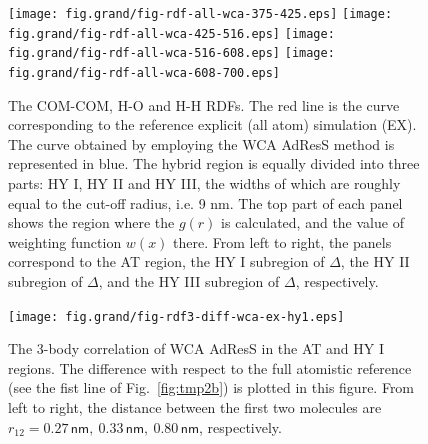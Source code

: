 \documentclass[aip,jcp,a4paper,reprint,onecolumn]{revtex4-1}
\begin{document}
\begin{figure}
  \centering
  \texttt{[image: fig.grand/fig-rdf-all-wca-375-425.eps]}
  \texttt{[image: fig.grand/fig-rdf-all-wca-425-516.eps]}
  \texttt{[image: fig.grand/fig-rdf-all-wca-516-608.eps]}
  \texttt{[image: fig.grand/fig-rdf-all-wca-608-700.eps]}
  \caption{
    The COM-COM, H-O and H-H RDFs. 
    The red line is the curve corresponding to the reference explicit (all atom)
    simulation (EX).
    The curve obtained by employing the WCA AdResS 
    method is represented in blue.
    The hybrid region is equally
    divided into three parts: HY I, HY II and HY III, the widths of
    which are roughly equal to the cut-off radius, i.e. 9 \textsf{nm}.    
    The top part of each panel shows the region where the $g(r)$ is calculated,
    and the value of weighting function $w(x)$ there.
    From left to right, the panels correspond to the AT region, 
    the HY I subregion of $\Delta$,
    the HY II subregion of $\Delta$,
    and the HY III subregion of $\Delta$, respectively. 
  }
  \label{fig:wca-dist}
\end{figure}

\begin{figure}
  \centering
  \texttt{[image: fig.grand/fig-rdf3-diff-wca-ex-hy1.eps]}
  \caption{The 3-body correlation of WCA AdResS in the AT
    and HY I regions.
    The difference with respect to the full atomistic reference
    (see the fist line of Fig.~\ref{fig:tmp2b})
    is plotted in this figure. From left to right, the distance
    between the first two molecules are $r_{12} =
    0.27\,\textsf{nm},\ 0.33\,\textsf{nm},\  
    0.80\,\textsf{nm}$, respectively.
  }
  \label{fig:wca-g3}
\end{figure}
\end{document}
